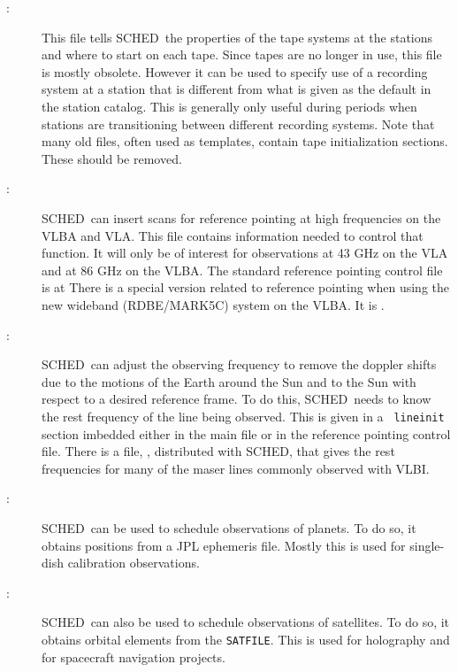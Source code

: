 \documentclass{report}
\newcommand{\sched}{{\sc SCHED}}
\newcommand{\schedb}{{\sc SCHED~}}
\begin{document}
\begin{description}
\item[:] This file tells
\schedb the properties of the tape systems at the stations and where
to start on each tape.  Since tapes are no longer in use, this file
is mostly obsolete.  However it can be used to specify use of a
recording system at a station that is different from what is given
as the default in the station catalog.  This is generally only useful
during periods when stations are transitioning between different
recording systems.  Note that many old files, often used as templates,
contain tape initialization sections.  These should be removed.

\item[:]
\schedb can insert scans for reference pointing at high frequencies on
the VLBA and VLA.  This file contains information needed to control
that function.  It will only be of interest for observations at 43 GHz
on the VLA and at 86 GHz on the VLBA.  The standard reference pointing
control file is at 
There is a special version related to reference pointing when using the
new wideband (RDBE/MARK5C) system on the VLBA.  It is .

\item[:] \schedb can
adjust the observing frequency to remove the doppler shifts due to the
motions of the Earth around the Sun and to the Sun with respect to a
desired reference frame.  To do this, \schedb needs to know the rest
frequency of the line being observed.  This is given in a {\tt
lineinit} section imbedded either in the main file or in the reference
pointing control file.  There is a file, , distributed
with \sched, that gives the rest frequencies for many of the maser
lines commonly observed with VLBI.

\item[:] \schedb can be used to
schedule observations of planets.  To do so, it obtains positions from
a JPL ephemeris file.  Mostly this is used for single-dish calibration
observations.

\item[:] \schedb can also be used to
schedule observations of satellites.  To do so, it obtains orbital elements
from the {\tt SATFILE}.  This is used for holography and for spacecraft
navigation projects.


\end{description}
\end{document}
